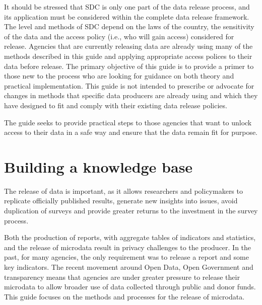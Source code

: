 \documentclass[letterpaper,10pt,english]{sphinxmanual}
\begin{document}
It should be stressed that SDC is only one part of the data release
process, and its application must be considered within the complete data
release framework. The level and methods of SDC depend on the laws of
the country, the sensitivity of the data and the access policy (i.e.,
who will gain access) considered for release. Agencies that are
currently releasing data are already using many of the methods described
in this guide and applying appropriate access polices to their data
before release. The primary objective of this guide is to provide a
primer to those new to the process who are looking for guidance on both
theory and practical implementation. This guide is not intended to
prescribe or advocate for changes in methods that specific data
producers are already using and which they have designed to fit and
comply with their existing data release policies.

The guide seeks to provide practical steps to those agencies that want
to unlock access to their data in a safe way and ensure that the data
remain fit for purpose.


\section{Building a knowledge base}
\label{\detokenize{intro:building-a-knowledge-base}}
The release of data is important, as it allows researchers and
policymakers to replicate officially published results, generate new
insights into issues, avoid duplication of surveys and provide greater
returns to the investment in the survey process.

Both the production of reports, with aggregate tables of indicators and
statistics, and the release of microdata result in privacy challenges to
the producer. In the past, for many agencies, the only requirement was
to release a report and some key indicators. The recent movement around
Open Data, Open Government and transparency means that agencies are
under greater pressure to release their microdata to allow broader use
of data collected through public and donor funds. This guide focuses on
the methods and processes for the release of microdata.
\end{document}
